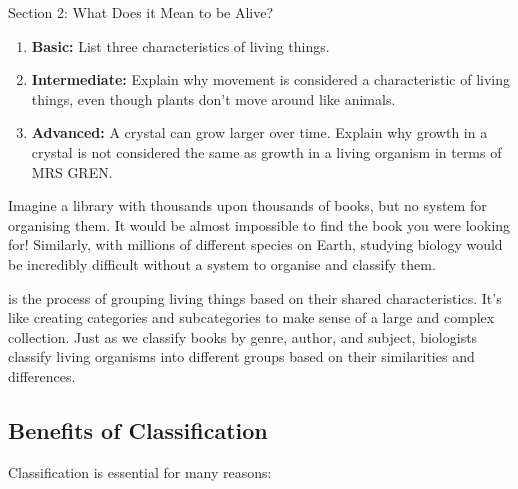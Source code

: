 \begin{tieredquestions}{Section 2: What Does it Mean to be Alive?}
\begin{enumerate}
    \item \textbf{Basic:} List three characteristics of living things.
    \item \textbf{Intermediate:} Explain why movement is considered a characteristic of living things, even though plants don't move around like animals.
    \item \textbf{Advanced:}  A crystal can grow larger over time.  Explain why growth in a crystal is not considered the same as growth in a living organism in terms of MRS GREN.
\end{enumerate}
\end{tieredquestions}


\FloatBarrier
\1

Imagine a library with thousands upon thousands of books, but no system for organising them.  It would be almost impossible to find the book you were looking for!  Similarly, with millions of different species on Earth, studying biology would be incredibly difficult without a system to organise and classify them.

 is the process of grouping living things based on their shared characteristics. It's like creating categories and subcategories to make sense of a large and complex collection.  Just as we classify books by genre, author, and subject, biologists classify living organisms into different groups based on their similarities and differences.

\subsection{Benefits of Classification}

Classification is essential for many reasons:

